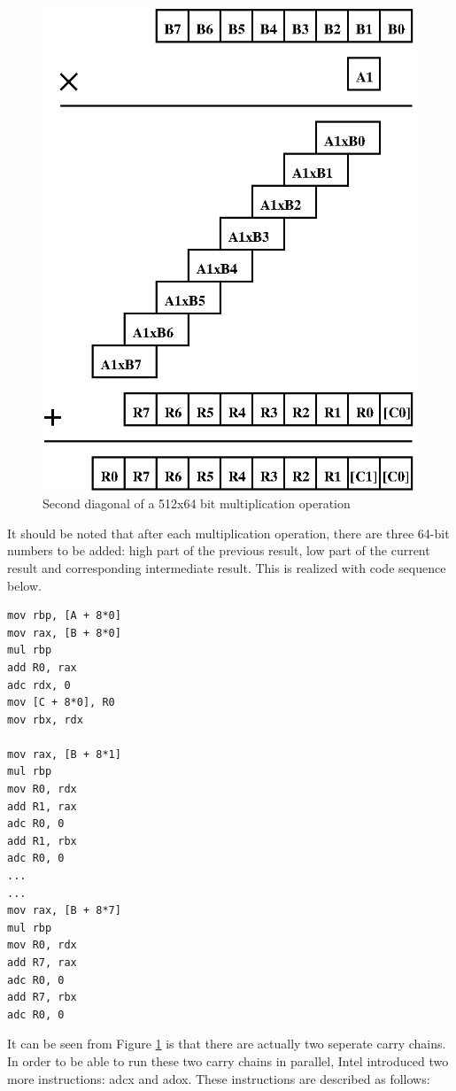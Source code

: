 \documentclass[twocolumn]{svjour3}          %
\begin{document}
\begin{figure}[ht]
\centering
  \includegraphics[scale=0.7]{multdiag1.eps}
\caption{Second diagonal of a 512x64 bit multiplication operation}
\label{fig:diag1}
\end{figure}

It should be noted that after each multiplication operation, there are three 64-bit numbers to be added: high part of the previous result, low part of the current result and corresponding intermediate result. This is realized with code sequence below. 

\begin{verbatim}
mov rbp, [A + 8*0]
mov rax, [B + 8*0]
mul rbp	
add	R0, rax
adc rdx, 0
mov [C + 8*0], R0
mov rbx, rdx

mov rax, [B + 8*1]
mul rbp
mov R0, rdx
add R1, rax
adc R0, 0
add R1, rbx
adc R0, 0
...
...
mov rax, [B + 8*7]
mul rbp
mov R0, rdx
add R7, rax
adc R0, 0
add R7, rbx
adc R0, 0
\end{verbatim}

It can be seen from Figure \ref{fig:diag1} is that there are actually two seperate carry chains. In order to be able to run these two carry chains in parallel, Intel introduced two more instructions: adcx and adox. These instructions are described as follows:
\end{document}
